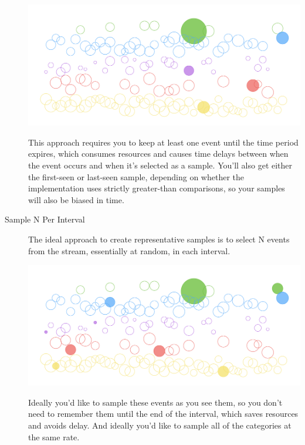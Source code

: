 \documentclass{vivid_layout}
\begin{document}
\begin{description}
\begin{center}
\includegraphics[width=\linewidth]{sketch-sampling/select-extreme-sample}
\end{center}

This approach requires you to keep at least one event until the time period
expires, which consumes resources and causes time delays between when the event
occurs and when it's selected as a sample.  You'll also get either the
first-seen or last-seen sample, depending on whether the implementation uses
strictly greater-than comparisons, so your samples will also be biased in time.

\item[Sample N Per Interval] The ideal approach to create representative samples
is to select N events from the stream, essentially at random, in each interval.

\begin{center}
\includegraphics[width=\linewidth]{sketch-sampling/select-n-per-interval}
\end{center}

Ideally you'd like to sample these events as you see them, so you don't need to
remember them until the end of the interval, which saves resources
and avoids delay. And ideally you'd like to sample all of the categories at
the same rate.

\end{description}
\end{document}
